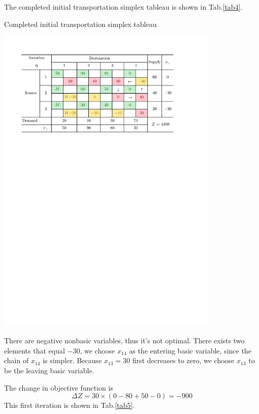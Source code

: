 \documentclass[a4paper]{article}
\begin{document}
\begin{enumerate}
\begin{enumerate}
\begin{solution}
		The completed initial transportation simplex tableau is shown in Tab.\ref{tab4}.
		\begin{table}[h]
			\caption{Completed initial transportation simplex tableau}
			\label{tab4}
			\centering
			\includegraphics[width = 0.8\textwidth]{NW2}				
		\end{table}
	
	    There are negative nonbasic variables, thus it's not optimal. There exists two elements that equal $-30$, we choose $x_{14}$ as the entering basic variable, since the chain of $x_{14}$ is simpler. Because $x_{13}=30$ first decreases to zero, we choose $x_{13}$ to be the leaving basic variable.
		
		\hspace*{4ex}The change in objective function is
		\begin{equation*}
		\Delta Z=30\times(0-80+50-0)=-900
		\end{equation*}
		This first iteration is shown in Tab.\ref{tab5}.
		

\end{solution}
\end{enumerate}
\end{enumerate}
\end{document}
